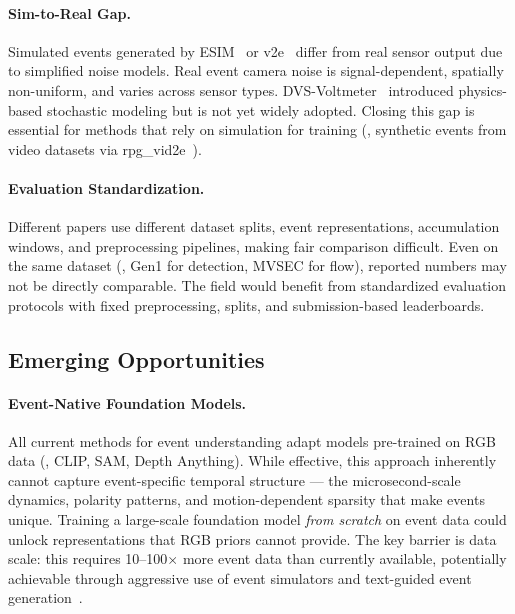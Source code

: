 \paragraph{Sim-to-Real Gap.}
Simulated events generated by ESIM~\cite{rebecq2018esim} or v2e~\cite{hu2021v2e} differ from real sensor output due to simplified noise models. Real event camera noise is signal-dependent, spatially non-uniform, and varies across sensor types. DVS-Voltmeter~\cite{lin2022dvsvoltmeter} introduced physics-based stochastic modeling but is not yet widely adopted. Closing this gap is essential for methods that rely on simulation for training (\eg, synthetic events from video datasets via rpg\_vid2e~\cite{gehrig2020vid2e}).

\paragraph{Evaluation Standardization.}
Different papers use different dataset splits, event representations, accumulation windows, and preprocessing pipelines, making fair comparison difficult. Even on the same dataset (\eg, Gen1 for detection, MVSEC for flow), reported numbers may not be directly comparable. The field would benefit from standardized evaluation protocols with fixed preprocessing, splits, and submission-based leaderboards.


\subsection{Emerging Opportunities}
\label{sec:conclusion_opportunities}

\paragraph{Event-Native Foundation Models.}
All current methods for event understanding adapt models pre-trained on RGB data (\eg, CLIP, SAM, Depth Anything). While effective, this approach inherently cannot capture event-specific temporal structure --- the microsecond-scale dynamics, polarity patterns, and motion-dependent sparsity that make events unique. Training a large-scale foundation model \textit{from scratch} on event data could unlock representations that RGB priors cannot provide. The key barrier is data scale: this requires 10--100$\times$ more event data than currently available, potentially achievable through aggressive use of event simulators and text-guided event generation~\cite{wu2025controlevents,barchid2024texttoevents}.

